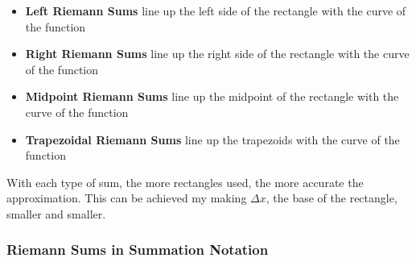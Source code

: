 \documentclass[12pt]{article}
\begin{document}
        \begin{itemize}
            
            \item \textbf{Left Riemann Sums} line up the left side of the rectangle with the curve of the function
            \item \textbf{Right Riemann Sums} line up the right side of the rectangle with the curve of the function
            \item \textbf{Midpoint Riemann Sums} line up the midpoint of the rectangle with the curve of the function
            \item \textbf{Trapezoidal Riemann Sums} line up the trapezoids with the curve of the function

        \end{itemize}

        With each type of sum, the more rectangles used, the more accurate the approximation. This can be achieved my making 
        $\Delta x$, the base of the rectangle, smaller and smaller. 

        \subsubsection{Riemann Sums in Summation Notation}
\end{document}
